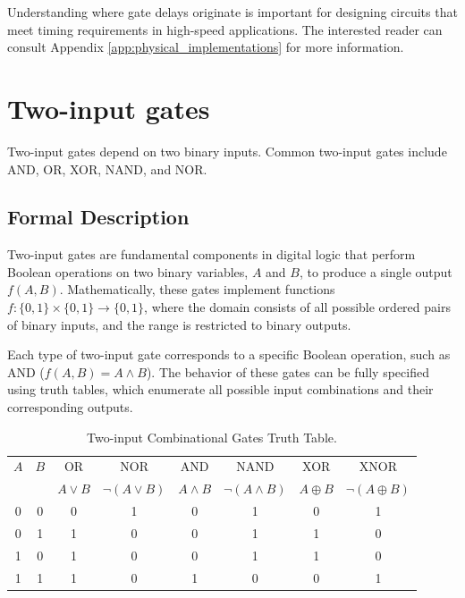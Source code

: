 Understanding where gate delays originate is important for designing circuits that meet timing requirements in high-speed applications. The interested reader can consult Appendix \ref{app:physical_implementations} for more information.

\section{Two-input gates}
Two-input gates depend on two binary inputs. Common two-input gates include AND, OR, XOR, NAND, and NOR. 

\subsection{Formal Description}
Two-input gates are fundamental components in digital logic that perform Boolean operations on two binary variables, \( A \) and \( B \), to produce a single output \( f(A, B) \). Mathematically, these gates implement functions \( f: \{0, 1\} \times \{0, 1\} \to \{0, 1\} \), where the domain consists of all possible ordered pairs of binary inputs, and the range is restricted to binary outputs. 

Each type of two-input gate corresponds to a specific Boolean operation, such as AND (\( f(A, B) = A \land B \)). The behavior of these gates can be fully specified using truth tables, which enumerate all possible input combinations and their corresponding outputs.

\begin{table}[H]
  \begin{center}
    \caption{Two-input Combinational Gates Truth Table.}
    \label{tab:two_input_gates}
    \begin{tabular}{|c|c||c|c|c|c|c|c|}
      \hline
      $A$& $B$&   OR&        NOR&              AND&     NAND&              XOR&         XNOR \\ 
       &  &  $A\lor B$ & $\neg (A \lor B)$& $A\land B$& $\neg (A \land B)$&  $A\oplus B$&   $\neg (A \oplus B)$                              \\ \hline \hline
      0& 0&  0&         1&                 0&       1&                  0&           1\\ \hline
      0& 1&  1&         0&                 0&       1&                  1&           0\\ \hline
      1& 0&  1&         0&                 0&       1&                  1&           0\\ \hline
      1& 1&  1&         0&                 1&       0&                  0&           1\\ \hline
    \end{tabular}
  \end{center}
\end{table}

